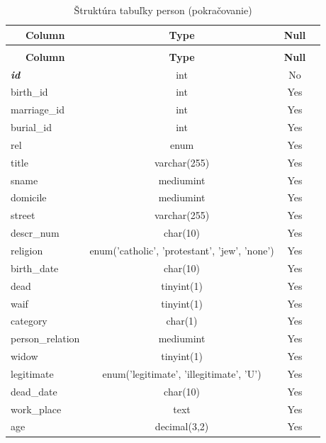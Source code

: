\begin{longtable}{|l|c|c|c|}
 \caption{Štruktúra tabuľky person} \label{tab:person-structure} \\
 \hline \multicolumn{1}{|c|}{\textbf{Column}} & \multicolumn{1}{|c|}{\textbf{Type}} & \multicolumn{1}{|c|}{\textbf{Null}} \\ \hline \hline
\endfirsthead
 \caption{Štruktúra tabuľky person (pokračovanie)} \\
 \hline \multicolumn{1}{|c|}{\textbf{Column}} & \multicolumn{1}{|c|}{\textbf{Type}} & \multicolumn{1}{|c|}{\textbf{Null}} \\ \hline \hline \endhead \endfoot
\textbf{\textit{id}} & int & No \\ \hline
birth\_id & int & Yes \\ \hline
marriage\_id & int & Yes \\ \hline
burial\_id & int & Yes \\ \hline
rel & enum & Yes \\ \hline
title & varchar(255) & Yes \\ \hline
sname & mediumint & Yes \\ \hline
domicile & mediumint & Yes \\ \hline
street & varchar(255) & Yes \\ \hline
descr\_num & char(10) & Yes \\ \hline
religion & enum('catholic', 'protestant', 'jew', 'none') & Yes \\ \hline
birth\_date & char(10) & Yes \\ \hline
dead & tinyint(1) & Yes \\ \hline
waif & tinyint(1) & Yes \\ \hline
category & char(1) & Yes \\ \hline
person\_relation & mediumint & Yes \\ \hline
widow & tinyint(1) & Yes \\ \hline
legitimate & enum('legitimate', 'illegitimate', 'U') & Yes \\ \hline
dead\_date & char(10) & Yes \\ \hline
work\_place & text & Yes \\ \hline
age & decimal(3,2) & Yes \\ \hline
 \end{longtable}

